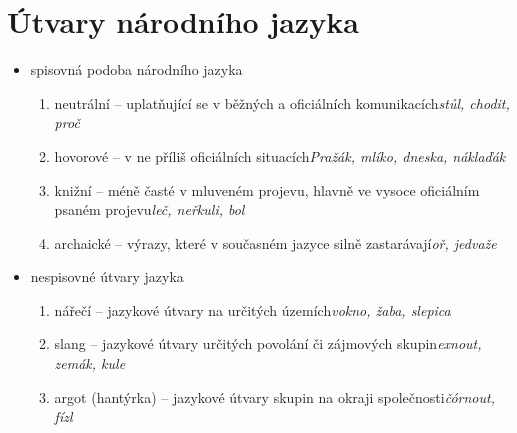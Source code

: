 \documentclass{memoir}
\begin{document}
\section*{Útvary národního jazyka}
	\begin{itemize}
		\item spisovná podoba národního jazyka
		\begin{enumerate}
			\item neutrální -- uplatňující se v běžných a oficiálních komunikacích\hfill\textit{stůl, chodit, proč}
			\item hovorové -- v ne příliš oficiálních situacích\hfill\textit{Pražák, mlíko, dneska, náklaďák}
			\item knižní -- méně časté v mluveném projevu, hlavně ve vysoce oficiálním psaném projevu\hfill\textit{leč, neřkuli, bol}
			\item archaické -- výrazy, které v současném jazyce silně zastarávají\hfill\textit{oř, jedvaže}
		\end{enumerate}
		\item nespisovné útvary jazyka
		\begin{enumerate}
			\item nářečí -- jazykové útvary na určitých územích\hfill\textit{vokno, žaba, slepica}
			\item slang -- jazykové útvary určitých povolání či zájmových skupin\hfill\textit{exnout, zemák, kule}
			\item argot (hantýrka) -- jazykové útvary skupin na okraji společnosti\hfill\textit{čórnout, fízl}
		\end{enumerate}
	\end{itemize}
\end{document}
